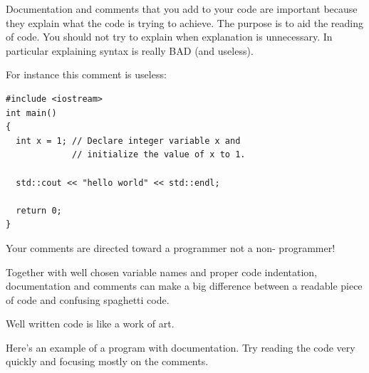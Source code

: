Documentation and comments that you add to your code are important
because they explain what the code is trying to achieve. The purpose is
to aid the reading of code. You should not try to explain when
explanation is unnecessary. In particular explaining syntax is really BAD
(and useless).

For instance this comment is useless:
\begin{Verbatim}[frame=single, fontsize=\footnotesize]
#include <iostream>
int main()
{
  int x = 1; // Declare integer variable x and
             // initialize the value of x to 1.

  std::cout << "hello world" << std::endl;

  return 0;
}
\end{Verbatim}

Your comments are directed toward a programmer not a non-
programmer!

Together with well chosen variable names and proper code indentation,
documentation and comments can make a big difference between a
readable piece of code and confusing spaghetti code.

Well written code is like a work of art.

Here's an example of a program with documentation. Try reading the
code very quickly and focusing mostly on the comments.

